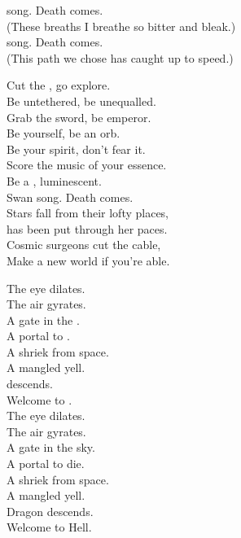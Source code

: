  song. Death comes. \\
(These breaths I breathe so bitter and bleak.) \\
 song. Death comes. \\
(This path we chose has caught up to speed.) \\


Cut the , go explore. \\
Be untethered, be unequalled. \\
Grab the sword, be emperor. \\
Be yourself, be an orb. \\
Be your spirit, don't fear it. \\
Score the music of your essence. \\
Be a , luminescent. \\
Swan song. Death comes. \\

Stars fall from their lofty places, \\
 has been put through her paces. \\
Cosmic surgeons cut the cable, \\
Make a new world if you're able. \\


The eye dilates. \\
The air gyrates. \\
A gate in the . \\
A portal to . \\
A shriek from space. \\
A mangled yell. \\
 descends. \\
Welcome to . \\

The eye dilates. \\
The air gyrates. \\
A gate in the sky. \\
A portal to die. \\
A shriek from space. \\
A mangled yell. \\
Dragon descends. \\
Welcome to Hell. \\


